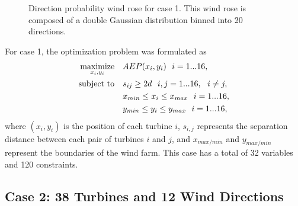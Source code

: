 \documentclass{jpconf}
\begin{document}
\begin{figure}[h!]
\begin{minipage}[t]{18pc}
\caption{Direction probability wind rose for case 1. This wind rose is composed of a double Gaussian distribution binned into 20 directions.}
\label{fig:directional}
\end{minipage} 
\end{figure}
%

For case 1, the optimization problem was formulated as
%
\begin{equation}
	\label{eqn:opt1}
	\begin{aligned} [b]
	\underset{x_i,y_i}{\textrm{maximize}} \quad & AEP(x_i,y_i)~~i=1...16,\\
	\textrm{subject to} \quad & s_{ij} \geq 2\*d~~i,j=1...16,~~i \neq j,\\
	 & x_{min} \leq x_i \leq x_{max}~~i=1...16,\\
     & y_{min} \leq y_i \leq y_{max}~~i=1...16,
	\end{aligned}
\end{equation}
%
%
where $(x_i,y_i)$ is the position of each turbine $i$, $s_{i,j}$ represents the separation distance between each pair of turbines $i$ and $j$, and $x_{max/min}$ and $y_{max/min}$ represent the boundaries of the wind farm. This case has a total of 32 variables and 120 constraints.

\subsection{Case 2: 38 Turbines and 12 Wind Directions}\label{sec:case2}
\end{document}

